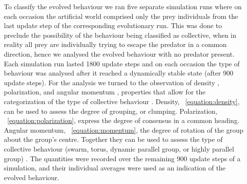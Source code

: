 To classify the evolved behaviour we ran five separate simulation runs where on each occasion the artificial world comprised only the prey individuals from the last update step of the corresponding evolutionary run. This was done to preclude the possibility of the behaviour being classified as collective, when in reality all prey are individually trying to escape the predator in a common direction, hence we analysed the evolved behaviour with no predator present. Each simulation run lasted 1800 update steps and on each occasion the type of behaviour was analysed after it reached a dynamically stable state (\ie after 900 update steps). For the analysis we turned to the observation of density \cite{olson2016evolution}, polarization, and angular momentum \cite{couzin2002collective}, properties that allow for the categorization of the type of collective behaviour \cite{couzin2002collective,olson2016evolution,tunstrom2013collective,vicsek2012collective,wood2007evolving}. Density, \eq~\eqref{equation:density}, can be used to assess the degree of grouping, or clumping. Polarization, \eq~\eqref{equation:polarization}, express the degree of consensus in a common heading. Angular momentum, \eq~\eqref{equation:momentum}, the degree of rotation of the group about the group's centre. Together they can be used to assess the type of collective behaviour (\ie swarm, torus, dynamic parallel group, or highly parallel group) \cite{couzin2002collective}. The quantities were recorded over the remaining 900 update steps of a simulation, and their individual averages were used as an indication of the evolved behaviour. 

